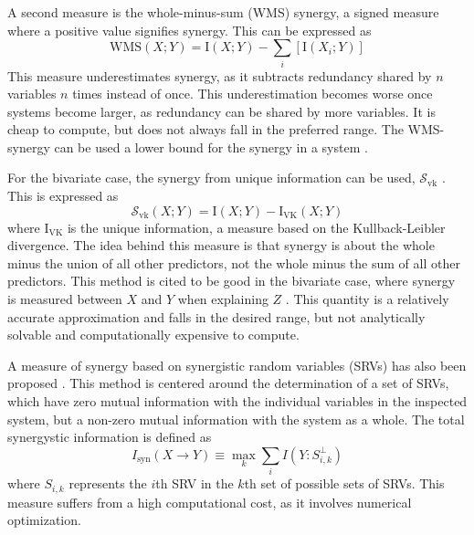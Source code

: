 \documentclass[../main.tex]{subfiles}
\begin{document}
A second measure is the whole-minus-sum (WMS) synergy, a signed measure where a positive value
signifies synergy.
This can be expressed as
%
\begin{equation}
\mathrm{WMS}(X;Y) = \mathrm{I}(X;Y) - \sum_i [\mathrm{I}(X_i;Y)]
\label{WMS}
\end{equation}
%
This measure underestimates synergy, as it subtracts redundancy shared by $n$ variables $n$ times instead of once.
This underestimation becomes worse once systems become larger, as redundancy can be shared by more variables.
It is cheap to compute, but does not always fall in the preferred range.
The WMS-synergy can be used a lower bound for the synergy in a system \cite{griffith2014quantifying, olbrich2015information}.

For the bivariate case, the synergy from unique information can be used, $\mathcal{S}_\mathrm{vk}$ \cite{bertschinger2014quantifying, griffith2014quantifying, olbrich2015information}.
This is expressed as
\begin{equation}
\mathcal{S}_\mathrm{vk} (X;Y) = \mathrm{I}(X;Y) - \mathrm{I}_\mathrm{VK} (X;Y)
\end{equation}
%
where $\mathrm{I}_\mathrm{VK}$ is the unique information, a measure based on the Kullback-Leibler divergence.
The idea behind this measure is that synergy is about the whole minus the union of all other predictors, not the whole minus the sum of all other predictors.
This method is cited to be good in the bivariate case, where synergy is measured between $X$ and $Y$ when explaining $Z$ \cite{olbrich2015information}.
This quantity is a relatively accurate approximation and falls in the desired range, but not analytically solvable and computationally expensive to compute.

A measure of synergy based on synergistic random variables (SRVs) has also been proposed \cite{quax2017quantifying}.
This method is centered around the determination of a set of SRVs, which have zero mutual information with the individual variables in the inspected system, but a non-zero mutual information with the system as a whole.
The total synergystic information is defined as
\begin{equation}
\label{SRV}
I_\mathrm{syn}(X \rightarrow Y) \equiv \max_k \sum_i I(Y : S_{i,k}^\perp)
\end{equation}
where $S_{i,k}$ represents the $i$th SRV in the $k$th set of possible sets of SRVs.
This measure suffers from a high computational cost, as it involves numerical optimization.
\end{document}
